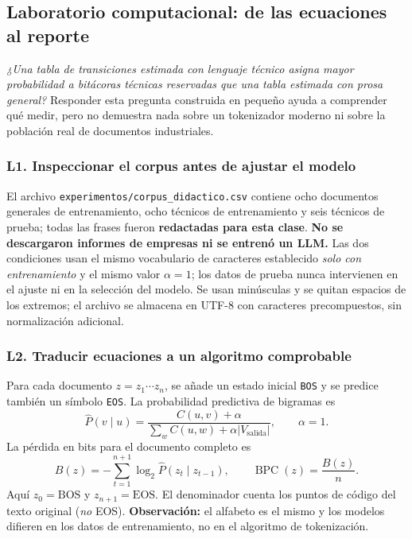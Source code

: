


\subsection{Laboratorio computacional: de las ecuaciones al reporte}
\label{s01:lab:comp}
\begin{idea}
\emph{¿Una tabla de transiciones estimada con lenguaje técnico asigna mayor
probabilidad a bitácoras técnicas reservadas que una tabla estimada con prosa general?}
Responder esta pregunta construida en pequeño ayuda a comprender qué medir,
pero no demuestra nada sobre un tokenizador moderno ni sobre la población real
de documentos industriales.
\end{idea}
\subsubsection*{L1. Inspeccionar el corpus antes de ajustar el modelo}
El archivo \nolinkurl{experimentos/corpus_didactico.csv} contiene ocho documentos
generales de entrenamiento, ocho técnicos de entrenamiento y seis técnicos
de prueba; todas las frases fueron \textbf{redactadas para esta clase}.
\textbf{No se descargaron informes de empresas ni se entrenó un LLM.}
Las dos condiciones usan el mismo vocabulario de caracteres establecido
\emph{solo con entrenamiento} y el mismo valor $\alpha=1$; los datos
de prueba nunca intervienen en el ajuste ni en la selección del modelo.
Se usan minúsculas y se quitan espacios de los extremos; el archivo se almacena
en UTF-8 con caracteres precompuestos, sin normalización adicional.

\subsubsection*{L2. Traducir ecuaciones a un algoritmo comprobable}
Para cada documento $z=z_1\cdots z_n$, se añade un estado inicial
\texttt{BOS} y se predice también un símbolo \texttt{EOS}. La probabilidad
predictiva de bigramas es
\[
\widehat P(v\mid u)=\frac{C(u,v)+\alpha}
{\sum_w C(u,w)+\alpha|V_{\mathrm{salida}}|},\qquad \alpha=1.
\]
La pérdida en bits para el documento completo es
\[
B(z)=-\sum_{t=1}^{n+1}\log_2 \widehat P(z_t\mid z_{t-1}),
\qquad \operatorname{BPC}(z)=\frac{B(z)}{n}.
\]
Aquí $z_0=\mathrm{BOS}$ y $z_{n+1}=\mathrm{EOS}$. El denominador
cuenta los puntos de código del texto original (\emph{no} EOS).
\textbf{Observación:} el alfabeto es el mismo y los modelos difieren en
los datos de entrenamiento, no en el algoritmo de tokenización.

